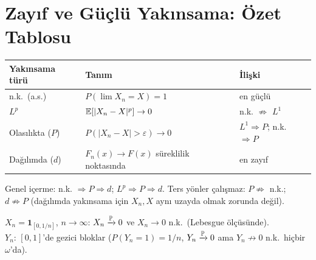 \section{Zayıf ve Güçlü Yakınsama: Özet Tablosu}
\label{app:yakin_ozet}

\begin{center}
\renewcommand{\arraystretch}{1.3}
\begin{tabular}{lll}
\hline
\textbf{Yakınsama türü} & \textbf{Tanım} & \textbf{İlişki} \\
\hline
n.k.\ (a.s.) & $P(\lim X_n=X)=1$ & en güçlü \\
$L^p$ & $\mathbb{E}[|X_n-X|^p]\to0$ & n.k. $\not\Rightarrow$ $L^1$ \\
Olasılıkta ($P$) & $P(|X_n-X|>\varepsilon)\to0$ & $L^1\Rightarrow P$; n.k. $\Rightarrow P$ \\
Dağılımda ($d$) & $F_n(x)\to F(x)$ süreklilik noktasında & en zayıf \\
\hline
\end{tabular}
\end{center}

Genel içerme: n.k. $\Rightarrow P \Rightarrow d$; $L^p \Rightarrow P \Rightarrow d$.
Ters yönler çalışmaz: $P\not\Rightarrow$ n.k.; $d\not\Rightarrow P$ (dağılımda yakınsama için $X_n,X$ aynı uzayda olmak zorunda değil).

\begin{ornek}\label{app:ex:yakin_karsiornek}
$X_n=\mathbf{1}_{[0,1/n]}$, $n\to\infty$: $X_n\xrightarrow{\mathbb{P}}0$ ve $X_n\to0$ n.k.\ (Lebesgue ölçüsünde). \\
$Y_n$: $[0,1]$'de gezici bloklar ($P(Y_n=1)=1/n$, $Y_n\xrightarrow{\mathbb{P}}0$ ama $Y_n\not\to0$ n.k.\ hiçbir $\omega$'da).
\end{ornek}
